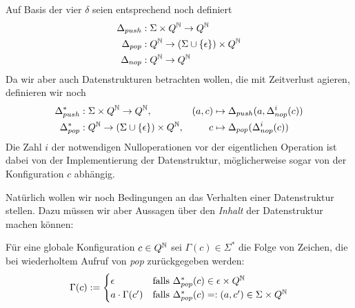 \documentclass{article}
\begin{document}
Auf Basis der vier $\delta$ seien entsprechend noch definiert
\begin{align*}
    \Delta_{push} &: \Sigma \times Q^{\mathbb{N}} \rightarrow Q^{\mathbb{N}} \\
    \Delta_{pop} &: Q^{\mathbb{N}} \rightarrow (\Sigma \cup \{\epsilon\}) \times Q^{\mathbb{N}} \\
    \Delta_{nop} &: Q^{\mathbb{N}} \rightarrow Q^{\mathbb{N}}
\end{align*}
Da wir aber auch Datenstrukturen betrachten wollen, die mit Zeitverlust agieren, definieren wir noch
\begin{align*}
    \Delta^*_{push} &: \Sigma \times Q^{\mathbb{N}} \rightarrow Q^{\mathbb{N}},& (a,c) &\mapsto \Delta_{push}(a,\Delta^i_{nop}(c)) \\
    \Delta^*_{pop} &: Q^{\mathbb{N}} \rightarrow (\Sigma \cup \{\epsilon\}) \times Q^{\mathbb{N}},& c &\mapsto \Delta_{pop}(\Delta^i_{nop}(c))
\end{align*}
Die Zahl $i$ der notwendigen Nulloperationen vor der eigentlichen Operation ist dabei von der Implementierung der Datenstruktur, möglicherweise sogar von der Konfiguration $c$ abhängig.

Natürlich wollen wir noch Bedingungen an das Verhalten einer Datenstruktur stellen. Dazu müssen wir aber Aussagen über den \emph{Inhalt} der Datenstruktur machen können:
\begin{definition}
    Für eine globale Konfiguration $c \in Q^{\mathbb{N}}$ sei $\Gamma(c) \in \Sigma^*$ die Folge von Zeichen, die bei wiederholtem Aufruf von \emph{pop} zurückgegeben werden:
    \[ \Gamma(c) := \begin{cases}
        \epsilon &\text{falls } \Delta^*_{pop}(c) \in \epsilon \times Q^{\mathbb{N}} \\
        a \cdot \Gamma(c') &\text{falls }\Delta^*_{pop}(c)=:(a,c') \in \Sigma \times Q^{\mathbb{N}}
    \end{cases} \]
\end{definition}
\end{document}
